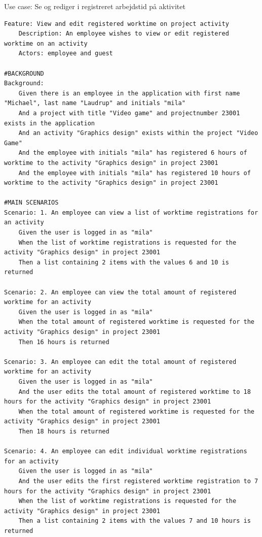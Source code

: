 \begin{listing}[H]
    \centering
    \caption{Use case: Se og rediger i registreret arbejdstid på aktivitet}\label{lst:usecase_se_og_rediger_i_registreret_arbejdstid_paa_aktivitet}
    \begin{verbatim}  
Feature: View and edit registered worktime on project activity
    Description: An employee wishes to view or edit registered worktime on an activity
    Actors: employee and guest

#BACKGROUND
Background:
    Given there is an employee in the application with first name "Michael", last name "Laudrup" and initials "mila"
    And a project with title "Video game" and projectnumber 23001 exists in the application
    And an activity "Graphics design" exists within the project "Video Game"
    And the employee with initials "mila" has registered 6 hours of worktime to the activity "Graphics design" in project 23001
    And the employee with initials "mila" has registered 10 hours of worktime to the activity "Graphics design" in project 23001

#MAIN SCENARIOS
Scenario: 1. An employee can view a list of worktime registrations for an activity
    Given the user is logged in as "mila"
    When the list of worktime registrations is requested for the activity "Graphics design" in project 23001
    Then a list containing 2 items with the values 6 and 10 is returned

Scenario: 2. An employee can view the total amount of registered worktime for an activity
    Given the user is logged in as "mila"
    When the total amount of registered worktime is requested for the activity "Graphics design" in project 23001
    Then 16 hours is returned

Scenario: 3. An employee can edit the total amount of registered worktime for an activity
    Given the user is logged in as "mila"
    And the user edits the total amount of registered worktime to 18 hours for the activity "Graphics design" in project 23001
    When the total amount of registered worktime is requested for the activity "Graphics design" in project 23001
    Then 18 hours is returned

Scenario: 4. An employee can edit individual worktime registrations for an activity
    Given the user is logged in as "mila"
    And the user edits the first registered worktime registration to 7 hours for the activity "Graphics design" in project 23001
    When the list of worktime registrations is requested for the activity "Graphics design" in project 23001
    Then a list containing 2 items with the values 7 and 10 hours is returned


\end{verbatim}
\end{listing}
